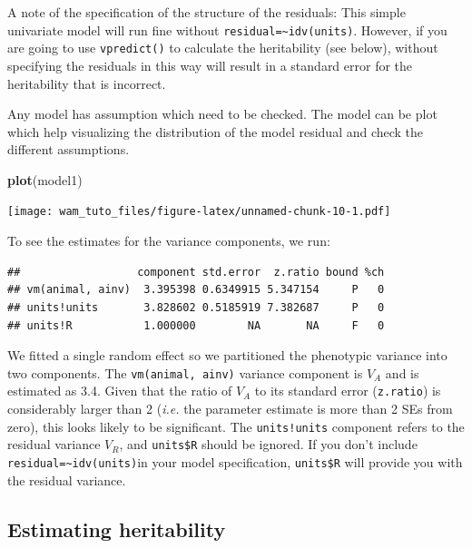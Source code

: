 \documentclass[
  12pt,
]{book}
\newenvironment{Shaded}{\begin{snugshade}}{\end{snugshade}}
\newcommand{\KeywordTok}[1]{\textcolor[rgb]{0.13,0.29,0.53}{\textbf{#1}}}
\newcommand{\NormalTok}[1]{#1}
\newcommand{\OperatorTok}[1]{\textcolor[rgb]{0.81,0.36,0.00}{\textbf{#1}}}
\begin{document}
A note of the specification of the structure of the residuals: This simple univariate model will run fine without \texttt{residual=\textasciitilde{}idv(units)}. However, if you are going to use \texttt{vpredict()} to calculate the heritability (see below), without specifying the residuals in this way will result in a standard error for the heritability that is incorrect.

Any model has assumption which need to be checked. The model can be plot which help visualizing the distribution of the model residual and check the different assumptions.

\begin{Shaded}
\begin{Highlighting}[]
\KeywordTok{plot}\NormalTok{(model1)}
\end{Highlighting}
\end{Shaded}

\texttt{[image: wam\_tuto\_files/figure-latex/unnamed-chunk-10-1.pdf]}

To see the estimates for the variance components, we run:

\begin{Shaded}
\end{Shaded}

\begin{verbatim}
##                  component std.error  z.ratio bound %ch
## vm(animal, ainv)  3.395398 0.6349915 5.347154     P   0
## units!units       3.828602 0.5185919 7.382687     P   0
## units!R           1.000000        NA       NA     F   0
\end{verbatim}

We fitted a single random effect so we partitioned the phenotypic variance into two components. The \texttt{vm(animal,\ ainv)} variance component is \(V_A\) and is estimated as 3.4. Given that the ratio of \(V_A\) to its standard error (\texttt{z.ratio}) is considerably larger than 2 (\emph{i.e.} the parameter estimate is more than 2 SEs from zero), this looks likely to be significant. The \texttt{units!units} component refers to the residual variance \(V_R\), and \texttt{units\$R} should be ignored. If you don't include \texttt{residual=\textasciitilde{}idv(units)}in your model specification, \texttt{units\$R} will provide you with the residual variance.

\hypertarget{estimating-heritability}{%
\subsection{Estimating heritability}\label{estimating-heritability}}
\end{document}
